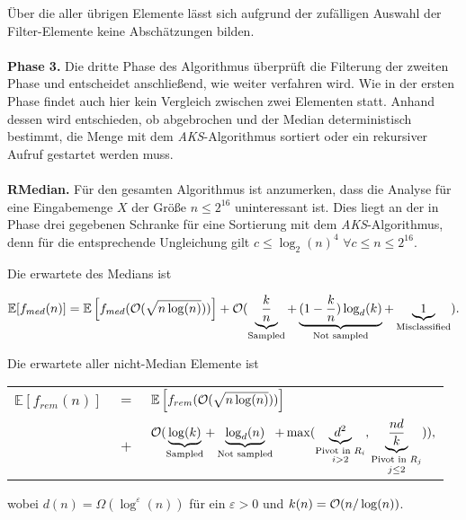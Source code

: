 Über die \fg aller übrigen Elemente lässt sich aufgrund der zufälligen Auswahl der Filter-Elemente keine Abschätzungen bilden.\\[.1cm]
\noindent\makebox[\linewidth]{\color{gray}{\hdashrule[0.5ex]{\linewidth}{0.5pt}{1.5mm}}}\\[.05cm]
\textbf{Phase 3.} Die dritte Phase des Algorithmus überprüft die Filterung der zweiten Phase und entscheidet anschließend, wie weiter verfahren wird. Wie in der ersten Phase findet auch hier kein Vergleich zwischen zwei Elementen statt. Anhand dessen wird entschieden, ob abgebrochen und der Median deterministisch bestimmt, die Menge mit dem \textit{AKS}-Algorithmus sortiert oder ein rekursiver Aufruf gestartet werden muss.\\[.1cm]
\noindent\makebox[\linewidth]{\color{gray}{\hdashrule[0.5ex]{\linewidth}{0.5pt}{1.5mm}}}\\[.05cm]
\textbf{RMedian.} Für den gesamten Algorithmus ist anzumerken, dass die Analyse für eine Eingabemenge $X$ der Größe $n\leq 2^{16}$ uninteressant ist. Dies liegt an der in Phase drei gegebenen Schranke für eine Sortierung mit dem \textit{AKS}-Algorithmus, denn für die entsprechende Ungleichung gilt $c \leq \log_2(n)^4$ $\forall c\leq n\leq 2^{16}$.\\[.1cm]
\noindent\makebox[\linewidth]{\color{gray}{\hdashrule[0.5ex]{\linewidth}{0.5pt}{1.5mm}}}

\begin{manuallemma}{26}\label{lem: med_26}
Die erwartete \fg des Medians \fgM ist

\[
\mathbb{E}[f_{med}(n)]=\mathbb{E}\left[f_{med}(\mathcal{O}(\sqrt{n\log(n)}))\right]+\mathcal{O}(\underbrace{\frac{k}{n}}_{\text{Sampled}}+\underbrace{(1-\frac{k}{n})\log_d(k)}_{\text{Not sampled}}+\underbrace{1}_{\text{Misclassified}}).
\]


\end{manuallemma}

\begin{manuallemma}{27}\label{lem: med_27}
Die erwartete \fg aller nicht-Median Elemente \fgr ist

\begin{center}
\begin{tabular}{lcl}
$\mathbb{E}[f_{rem}(n)]$&$=$&$\mathbb{E}\left[f_{rem}(\mathcal{O}(\sqrt{n\log(n)}))\right]$\\
&$+$&$\mathcal{O}(\underbrace{\log(k)}_{\text{Sampled}}+\underbrace{\log_d(n)}_{\text{Not sampled}}+\max(\underbrace{d^2}_{\substack{\text{Pivot in }R_i \\ i>2}}, \underbrace{\frac{nd}{k}}_{\substack{\text{Pivot in } R_j\\ j\leq 2}})),$
\end{tabular}
\end{center}
wobei $d(n)=\Omega(\log^{\varepsilon}(n))$ für ein $\varepsilon >0$ und $k(n)=\mathcal{O}(n/\log(n))$.
\end{manuallemma}


